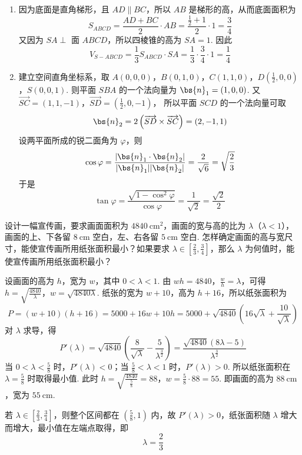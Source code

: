 \begin{solution}
\begin{enumerate}
\item 因为底面是直角梯形，且 \(AD\parallel BC\)，所以 \(AB\) 是梯形的高，从而底面面积为
\[
S_{ABCD}=\frac{AD+BC}{2}\cdot AB=\frac{\frac{1}{2}+1}{2}\cdot1=\frac{3}{4}
\]
又因为 \(SA\perp\) 面 \(ABCD\)，所以四棱锥的高为 \(SA=1\). 因此
\[
V_{S-ABCD}=\frac{1}{3}S_{ABCD}\cdot SA=\frac{1}{3}\cdot\frac{3}{4}\cdot1=\frac{1}{4}
\]
\item 建立空间直角坐标系，取
\(A(0,0,0)\)，\(B(0,1,0)\)，\(C(1,1,0)\)，\(D\left(\frac{1}{2},0,0\right)\)，\(S(0,0,1)\).
则平面 \(SBA\) 的一个法向量为 \(\bs{n}_1=(1,0,0)\). 又
\(\overrightarrow{SC}=(1,1,-1)\)，\(\overrightarrow{SD}=\left(\frac{1}{2},0,-1\right)\)，
所以平面 \(SCD\) 的一个法向量可取
\[
\bs{n}_2=2\left(\overrightarrow{SD}\times\overrightarrow{SC}\right)=(2,-1,1)
\]
设两平面所成的锐二面角为 \(\varphi\)，则
\[
\cos\varphi=\frac{|\bs{n}_1\cdot\bs{n}_2|}{|\bs{n}_1||\bs{n}_2|}=\frac{2}{\sqrt{6}}=\sqrt{\frac{2}{3}}
\]
于是
\[
\tan\varphi=\frac{\sqrt{1-\cos^2\varphi}}{\cos\varphi}=\frac{1}{\sqrt{2}}=\frac{\sqrt{2}}{2}
\]
\end{enumerate}
\end{solution}

\begin{problem}
设计一幅宣传画，要求画面面积为 \(4840 \mathrm{~cm}^2\)，画面的宽与高的比为 \(\lambda\)（\(\lambda < 1\)），画面的上、下各留 \(8 \mathrm{~cm}\) 空白，左、右各留 \(5 \mathrm{~cm}\) 空白. 怎样确定画面的高与宽尺寸，能使宣传画所用纸张面积最小？如果要求 \(\lambda \in \left[\frac{2}{3}, \frac{3}{4}\right]\)，那么 \(\lambda\) 为何值时，能使宣传画所用纸张面积最小？
\end{problem}

\begin{solution}
设画面的高为 \(h\)，宽为 \(w\)，其中 \(0<\lambda<1\). 由 \(wh=4840\)，\(\frac{w}{h}=\lambda\)，可得
\(h=\sqrt{\frac{4840}{\lambda}}\)，\(w=\sqrt{4840\lambda}\).
纸张的宽为 \(w+10\)，高为 \(h+16\)，所以纸张面积为
\[
P=(w+10)(h+16)=5000+16w+10h=5000+\sqrt{4840}\left(16\sqrt{\lambda}+\frac{10}{\sqrt{\lambda}}\right)
\]
对 \(\lambda\) 求导，得
\[
P'(\lambda)=\sqrt{4840}\left(\frac{8}{\sqrt{\lambda}}-\frac{5}{\lambda^{\frac{3}{2}}}\right)=\frac{\sqrt{4840}(8\lambda-5)}{\lambda^{\frac{3}{2}}}
\]
当 \(0<\lambda<\frac{5}{8}\) 时，\(P'(\lambda)<0\)；当 \(\frac{5}{8}<\lambda<1\) 时，\(P'(\lambda)>0\). 所以纸张面积在 \(\lambda=\frac{5}{8}\) 时取得最小值. 此时
\(h=\sqrt{\frac{4840}{\frac{5}{8}}}=88\)，\(w=\frac{5}{8}\cdot88=55\).
即画面的高为 \(88\mathrm{~cm}\)，宽为 \(55\mathrm{~cm}\).

若 \(\lambda\in\left[\frac{2}{3},\frac{3}{4}\right]\)，则整个区间都在 \(\left(\frac{5}{8},1\right)\) 内，故 \(P'(\lambda)>0\)，纸张面积随 \(\lambda\) 增大而增大，最小值在左端点取得，即
\[
\lambda=\frac{2}{3}
\]
\end{solution}


